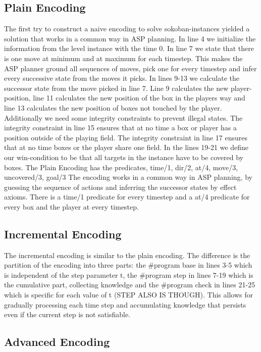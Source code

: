 \documentclass{report}
\begin{document}
\subsection{Plain Encoding}

The first try to construct a naive encoding to solve sokoban-instances yielded a solution that works in a common way in ASP planning. In line 4 we initialize the information from the level instance with the time 0. In line 7 we state that there is one move at minimum and at maximum for each timestep. This makes the ASP planner ground all sequences of moves, pick one for every timestep and infer every successive state from the moves it picks. In lines 9-13 we calculate the successor state from the move picked in line 7. Line 9 calculates the new player-position, line 11 calculates the new position of the box in the players way and line 13 calculates the new position of boxes not touched by the player. Additionally we need some integrity constraints to prevent illegal states. The integrity constraint in line 15 ensures that at no time a box or player has a position outside of the playing field. The integrity constraint in line 17 ensures that at no time boxes or the player share one field.
In the lines 19-21 we define our win-condition to be that all targets in the instance have to be covered by boxes.
The Plain Encoding has the predicates, time/1, dir/2, at/4, move/3, uncovered/3, goal/3
The encoding works in a common way in ASP planning, by guessing the sequence of actions and inferring the successor states by effect axioms. There is a time/1 predicate for every timestep and a at/4 predicate for every box and the player at every timestep.

\subsection{Incremental Encoding}

The incremental encoding is similar to the plain encoding. The difference is the partition of the encoding into three parts: the \#program base in lines 3-5 which is independent of the step parameter t, the \#program step in lines 7-19 which is the cumulative part, collecting knowledge and the \#program check in lines 21-25 which is specific for each value of t (STEP ALSO IS THOUGH). This allows for gradually processing each time step and accumulating knowledge that persists even if the current step is not satisfiable.

\subsection{Advanced Encoding}

\end{document}
